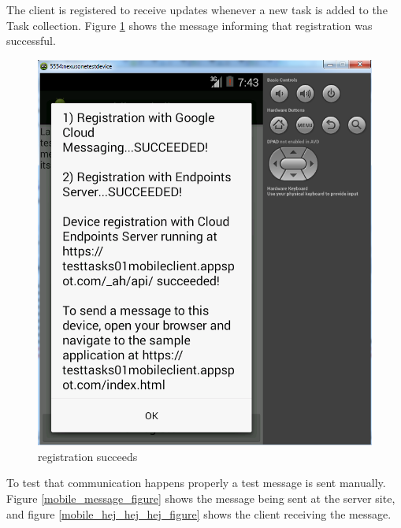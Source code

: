 \pagebreak
The client is registered to receive updates whenever a new task is added to the Task collection. Figure \ref{mobile_registration_figure} shows the message informing that registration was successful.\\

\begin{figure}[H]
	\centering
	\includegraphics[scale=0.7]{images/googlemessagin_isonline_cloudmessaging.png}
	\caption{registration succeeds}
	\label{mobile_registration_figure}
\end{figure}

\pagebreak
To test that communication happens properly a test message is sent manually. Figure \ref{mobile_message_figure} shows the message being sent at the server site, and figure \ref{mobile_hej_hej_hej_figure} shows the client receiving the message.\\

